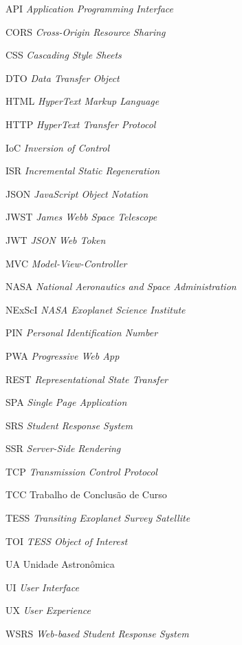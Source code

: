 \documentclass[
	12pt,
	openany,
	oneside,
	a4paper,
	english,
	brazil
]{abntex2}
\newcommand{\listofquadrosname}{Lista de quadros}
\begin{document}
\listoffigures*
\clearpage

\pdfbookmark[0]{\listofquadrosname}{loq}
\listofquadros*
\clearpage

\listoftables*
\clearpage

\begin{siglas}
  \item[API] \textit{Application Programming Interface}
  \item[CORS] \textit{Cross-Origin Resource Sharing}
  \item[CSS] \textit{Cascading Style Sheets}
  \item[DTO] \textit{Data Transfer Object}
  \item[HTML] \textit{HyperText Markup Language}
  \item[HTTP] \textit{HyperText Transfer Protocol}
  \item[IoC] \textit{Inversion of Control}
  \item[ISR] \textit{Incremental Static Regeneration}
  \item[JSON] \textit{JavaScript Object Notation}
  \item[JWST] \textit{James Webb Space Telescope}
  \item[JWT] \textit{JSON Web Token}
  \item[MVC] \textit{Model-View-Controller}
  \item[NASA] \textit{National Aeronautics and Space Administration}
  \item[NExScI] \textit{NASA Exoplanet Science Institute}
  \item[PIN] \textit{Personal Identification Number}
  \item[PWA] \textit{Progressive Web App}
  \item[REST] \textit{Representational State Transfer}
  \item[SPA] \textit{Single Page Application}
  \item[SRS] \textit{Student Response System}
  \item[SSR] \textit{Server-Side Rendering}
  \item[TCP] \textit{Transmission Control Protocol}
  \item[TCC] Trabalho de Conclusão de Curso
  \item[TESS] \textit{Transiting Exoplanet Survey Satellite}
  \item[TOI] \textit{TESS Object of Interest}
  \item[UA] Unidade Astronômica
  \item[UI] \textit{User Interface}
  \item[UX] \textit{User Experience}
  \item[WSRS] \textit{Web-based Student Response System}
\end{siglas}
\end{document}
